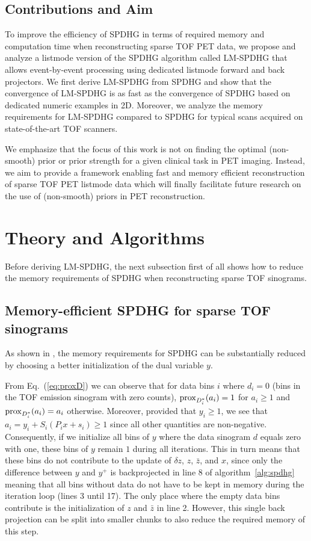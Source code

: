 \subsection*{Contributions and Aim}

To improve the efficiency of SPDHG in terms of required memory and computation time when reconstructing 
sparse TOF PET data, we propose and analyze a listmode version of the SPDHG algorithm  called
LM-SPDHG that allows event-by-event processing using dedicated listmode forward and back projectors.
We first derive LM-SPDHG from SPDHG and show that the convergence of LM-SPDHG is as 
fast as the convergence of SPDHG based on dedicated numeric examples in 2D.
Moreover, we analyze the memory requirements for LM-SPDHG compared to SPDHG for typical scans 
acquired on state-of-the-art TOF scanners.

We emphasize that the focus of this work is not on finding the
optimal (non-smooth) prior or prior strength for a given clinical task in PET imaging.
Instead, we aim to provide a framework enabling fast and memory efficient reconstruction of 
sparse TOF PET listmode data which will finally facilitate future research on the use of
(non-smooth) priors in PET reconstruction. 


\section{Theory and Algorithms}

Before deriving LM-SPDHG, the next subsection first of all shows how to reduce the memory 
requirements of SPDHG when reconstructing sparse TOF sinograms. 

\subsection*{Memory-efficient SPDHG for sparse TOF sinograms}

As shown in \cite{Schramm2021}, the memory requirements for SPDHG can be substantially reduced by 
choosing a better initialization of the dual variable $y$.

From Eq.~(\ref{eq:proxD}) we can observe that for data bins $i$ where $d_i = 0$ 
(bins in the TOF emission sinogram with zero counts), 
$\operatorname{prox}_{D_i^*}(a_i) = 1$ for $a_i \geq 1$ and $\operatorname{prox}_{D_i^*}(a_i) = a_i$ 
otherwise. 
Moreover, provided that $y_i \geq 1$, we see that $ a_i = y_i + S_i (P_i x + s_i) \geq 1$ 
since all other quantities are non-negative. 
Consequently, if we initialize all bins of $y$ where the data sinogram $d$ equals zero with one, 
these bins of $y$ remain $1$ during all iterations. 
This in turn means that these bins do not contribute to the update of $\delta z$, $z$, $\bar{z}$, 
and $x$, since only the difference between
$y$ and $y^+$ is backprojected in line 8 of algorithm~\ref{alg:spdhg} meaning that all
bins without data do not have to be kept in memory during the iteration loop (lines 3 until 17). 
The only place where the empty data bins contribute is the initialization of $z$ and $\bar{z}$
in line 2.
However, this single back projection can be split into smaller chunks to also reduce
the required memory of this step.

